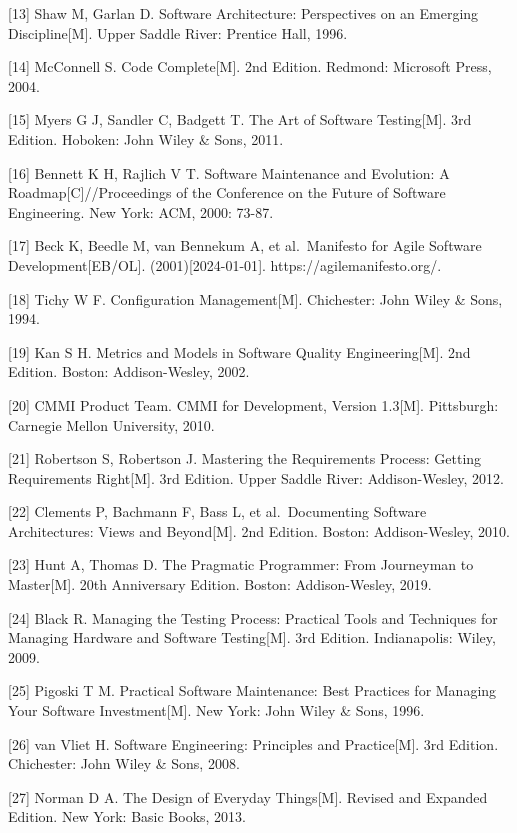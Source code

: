 {[}13{]} Shaw M, Garlan D. Software Architecture: Perspectives on an Emerging Discipline{[}M{]}. Upper Saddle River: Prentice Hall, 1996.

{[}14{]} McConnell S. Code Complete{[}M{]}. 2nd Edition. Redmond: Microsoft Press, 2004.

{[}15{]} Myers G J, Sandler C, Badgett T. The Art of Software Testing{[}M{]}. 3rd Edition. Hoboken: John Wiley \& Sons, 2011.

{[}16{]} Bennett K H, Rajlich V T. Software Maintenance and Evolution: A Roadmap{[}C{]}//Proceedings of the Conference on the Future of Software Engineering. New York: ACM, 2000: 73-87.

{[}17{]} Beck K, Beedle M, van Bennekum A, et al.~Manifesto for Agile Software Development{[}EB/OL{]}. (2001){[}2024-01-01{]}. https://agilemanifesto.org/.

{[}18{]} Tichy W F. Configuration Management{[}M{]}. Chichester: John Wiley \& Sons, 1994.

{[}19{]} Kan S H. Metrics and Models in Software Quality Engineering{[}M{]}. 2nd Edition. Boston: Addison-Wesley, 2002.

{[}20{]} CMMI Product Team. CMMI for Development, Version 1.3{[}M{]}. Pittsburgh: Carnegie Mellon University, 2010.

{[}21{]} Robertson S, Robertson J. Mastering the Requirements Process: Getting Requirements Right{[}M{]}. 3rd Edition. Upper Saddle River: Addison-Wesley, 2012.

{[}22{]} Clements P, Bachmann F, Bass L, et al.~Documenting Software Architectures: Views and Beyond{[}M{]}. 2nd Edition. Boston: Addison-Wesley, 2010.

{[}23{]} Hunt A, Thomas D. The Pragmatic Programmer: From Journeyman to Master{[}M{]}. 20th Anniversary Edition. Boston: Addison-Wesley, 2019.

{[}24{]} Black R. Managing the Testing Process: Practical Tools and Techniques for Managing Hardware and Software Testing{[}M{]}. 3rd Edition. Indianapolis: Wiley, 2009.

{[}25{]} Pigoski T M. Practical Software Maintenance: Best Practices for Managing Your Software Investment{[}M{]}. New York: John Wiley \& Sons, 1996.

{[}26{]} van Vliet H. Software Engineering: Principles and Practice{[}M{]}. 3rd Edition. Chichester: John Wiley \& Sons, 2008.

{[}27{]} Norman D A. The Design of Everyday Things{[}M{]}. Revised and Expanded Edition. New York: Basic Books, 2013.

